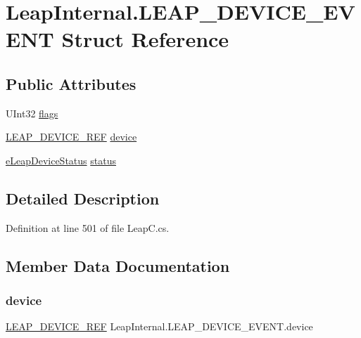 \hypertarget{struct_leap_internal_1_1_l_e_a_p___d_e_v_i_c_e___e_v_e_n_t}{}\section{Leap\+Internal.\+L\+E\+A\+P\+\_\+\+D\+E\+V\+I\+C\+E\+\_\+\+E\+V\+E\+NT Struct Reference}
\label{struct_leap_internal_1_1_l_e_a_p___d_e_v_i_c_e___e_v_e_n_t}
\subsection*{Public Attributes}
\begin{DoxyCompactItemize}
\item 
U\+Int32 \mbox{\hyperlink{struct_leap_internal_1_1_l_e_a_p___d_e_v_i_c_e___e_v_e_n_t_a68f2f7e3e5c44932a90b201b87acabb8}{flags}}
\item 
\mbox{\hyperlink{struct_leap_internal_1_1_l_e_a_p___d_e_v_i_c_e___r_e_f}{L\+E\+A\+P\+\_\+\+D\+E\+V\+I\+C\+E\+\_\+\+R\+EF}} \mbox{\hyperlink{struct_leap_internal_1_1_l_e_a_p___d_e_v_i_c_e___e_v_e_n_t_a57827dd7e69df09b13afe66484607cf0}{device}}
\item 
\mbox{\hyperlink{namespace_leap_internal_a16b28ea79f39b6205c514b3e9b075bed}{e\+Leap\+Device\+Status}} \mbox{\hyperlink{struct_leap_internal_1_1_l_e_a_p___d_e_v_i_c_e___e_v_e_n_t_a1634e22669a78768f6e8e584ad4af0af}{status}}
\end{DoxyCompactItemize}


\subsection{Detailed Description}


Definition at line 501 of file Leap\+C.\+cs.



\subsection{Member Data Documentation}
\mbox{\label{struct_leap_internal_1_1_l_e_a_p___d_e_v_i_c_e___e_v_e_n_t_a57827dd7e69df09b13afe66484607cf0}} 
\subsubsection{\texorpdfstring{device}{device}}
{\footnotesize\ttfamily \mbox{\hyperlink{struct_leap_internal_1_1_l_e_a_p___d_e_v_i_c_e___r_e_f}{L\+E\+A\+P\+\_\+\+D\+E\+V\+I\+C\+E\+\_\+\+R\+EF}} Leap\+Internal.\+L\+E\+A\+P\+\_\+\+D\+E\+V\+I\+C\+E\+\_\+\+E\+V\+E\+N\+T.\+device}



